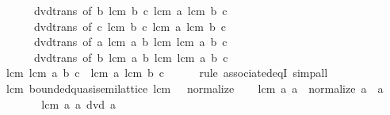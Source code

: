 \begin{isabellebody}
\ \ \ \ \ \ dvd{\isacharunderscore}{\kern0pt}trans\ {\isacharbrackleft}{\kern0pt}of\ b\ {\isachardoublequoteopen}lcm\ b\ c{\isachardoublequoteclose}\ {\isachardoublequoteopen}lcm\ a\ {\isacharparenleft}{\kern0pt}lcm\ b\ c{\isacharparenright}{\kern0pt}{\isachardoublequoteclose}{\isacharbrackright}{\kern0pt}\isanewline
\ \ \ \ \ \ dvd{\isacharunderscore}{\kern0pt}trans\ {\isacharbrackleft}{\kern0pt}of\ c\ {\isachardoublequoteopen}lcm\ b\ c{\isachardoublequoteclose}\ {\isachardoublequoteopen}lcm\ a\ {\isacharparenleft}{\kern0pt}lcm\ b\ c{\isacharparenright}{\kern0pt}{\isachardoublequoteclose}{\isacharbrackright}{\kern0pt}\isanewline
\ \ \ \ \ \ dvd{\isacharunderscore}{\kern0pt}trans\ {\isacharbrackleft}{\kern0pt}of\ a\ {\isachardoublequoteopen}lcm\ a\ b{\isachardoublequoteclose}\ {\isachardoublequoteopen}lcm\ {\isacharparenleft}{\kern0pt}lcm\ a\ b{\isacharparenright}{\kern0pt}\ c{\isachardoublequoteclose}{\isacharbrackright}{\kern0pt}\isanewline
\ \ \ \ \ \ dvd{\isacharunderscore}{\kern0pt}trans\ {\isacharbrackleft}{\kern0pt}of\ b\ {\isachardoublequoteopen}lcm\ a\ b{\isachardoublequoteclose}\ {\isachardoublequoteopen}lcm\ {\isacharparenleft}{\kern0pt}lcm\ a\ b{\isacharparenright}{\kern0pt}\ c{\isachardoublequoteclose}{\isacharbrackright}{\kern0pt}{\isacharparenright}{\kern0pt}\isanewline
\ \ \isamarkupfalse%
\ \isamarkupfalse%
\ {\isachardoublequoteopen}lcm\ {\isacharparenleft}{\kern0pt}lcm\ a\ b{\isacharparenright}{\kern0pt}\ c\ {\isacharequal}{\kern0pt}\ lcm\ a\ {\isacharparenleft}{\kern0pt}lcm\ b\ c{\isacharparenright}{\kern0pt}{\isachardoublequoteclose}\isanewline
\ \ \ \ \isamarkupfalse%
\ {\isacharparenleft}{\kern0pt}rule\ associated{\isacharunderscore}{\kern0pt}eqI{\isacharparenright}{\kern0pt}\ simp{\isacharunderscore}{\kern0pt}all\isanewline
{}\isamarkupfalse%
%
\endisatagproof
{\isafoldproof}%
%
\isadelimproof
\isanewline
%
\endisadelimproof
\isanewline
{}\isamarkupfalse%
\ lcm{\isacharcolon}{\kern0pt}\ bounded{\isacharunderscore}{\kern0pt}quasi{\isacharunderscore}{\kern0pt}semilattice\ lcm\ {}\ {}\ normalize\isanewline
%
\isadelimproof
%
\endisadelimproof
%
\isatagproof
{}\isamarkupfalse%
\isanewline
\ \ \isamarkupfalse%
\ {\isachardoublequoteopen}lcm\ a\ a\ {\isacharequal}{\kern0pt}\ normalize\ a{\isachardoublequoteclose}\ \ a\isanewline
\ \ \isamarkupfalse%
\ {\isacharminus}{\kern0pt}\isanewline
\ \ \ \ \isamarkupfalse%
\ {\isachardoublequoteopen}lcm\ a\ a\ dvd\ a{\isachardoublequoteclose}\isanewline

\end{isabellebody}
